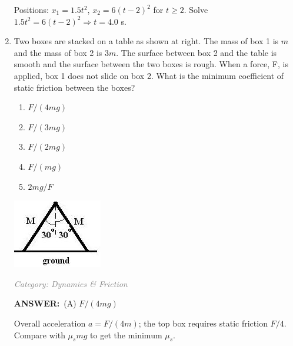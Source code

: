 ﻿\documentclass[12pt, a4paper]{article}
\makeatletter
\newcommand{\finalanswer}[1]{\textbf{ANSWER:}~#1}
\newif\if@categoryprinted
\newcommand{\category}[1]{\if@categoryprinted\relax\else\textit{\textcolor{gray}{Category: #1}}\global\@categoryprintedtrue\fi}
\newcommand{\tags}[1]{}
\makeatother
\begin{document}
\begin{CJK*}{UTF8}{gbsn}
\begin{enumerate}[itemsep=1.0em, topsep=0.6em]
\begin{solutionbox}
Positions: $x_1=1.5t^2$, $x_2=6(t-2)^2$ for $t\ge2$. Solve $1.5t^2=6(t-2)^2 \Rightarrow t=4.0$ s.
\end{solutionbox}

\item \label{prob:36}
\noindent\begin{minipage}[t]{0.6\linewidth}
\vspace{0pt}
Two boxes are stacked on a table as shown at right. The mass of box 1 is $m$ and the mass of box 2 is $3m$. The surface between box 2 and the table is smooth and the surface between the two boxes is rough. When a force, F, is applied, box 1 does not slide on box 2. What is the minimum coefficient of static friction between the boxes?
\begin{enumerate}[label=(\Alph*)]
    \item $F/(4mg)$
    \item $F/(3mg)$
    \item $F/(2mg)$
    \item $F/(mg)$
    \item $2mg/F$
\end{enumerate}
\end{minipage}%
\hfill
\begin{minipage}[t]{0.35\linewidth}
\vspace{0pt}
\centering
\includegraphics[width=\linewidth]{Problem_38_Figure.png}
\end{minipage}

\category{Dynamics \& Friction} \tags{}
\begin{answerbox}
\finalanswer{(A) $F/(4mg)$}
\end{answerbox}
\begin{insightbox}
Overall acceleration $a=F/(4m)$; the top box requires static friction $F/4$. Compare with $\mu_s mg$ to get the minimum $\mu_s$.
\end{insightbox}
\begin{solutionbox}


\end{solutionbox}
\end{enumerate}
\end{CJK*}
\end{document}
